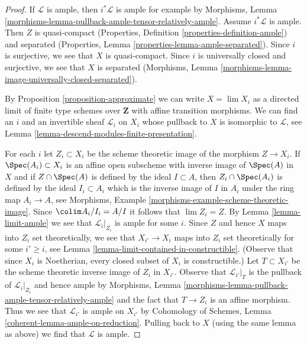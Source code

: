 \begin{proof}
If $\mathcal{L}$ is ample, then $i^*\mathcal{L}$ is ample for
example by Morphisms, Lemma
\ref{morphisms-lemma-pullback-ample-tensor-relatively-ample}.
Assume $i^*\mathcal{L}$ is ample. Then $Z$ is quasi-compact
(Properties, Definition \ref{properties-definition-ample})
and separated
(Properties, Lemma \ref{properties-lemma-ample-separated}).
Since $i$ is surjective, we see that $X$ is quasi-compact.
Since $i$ is universally closed and surjective, we see that
$X$ is separated (Morphisms, Lemma
\ref{morphisms-lemma-image-universally-closed-separated}).

\medskip\noindent
By Proposition \ref{proposition-approximate} we can write
$X = \lim X_i$ as a directed limit of finite type schemes over $\mathbf{Z}$
with affine transition morphisms. We can find an $i$ and an invertible
sheaf $\mathcal{L}_i$ on $X_i$ whose pullback to $X$ is isomorphic to
$\mathcal{L}$, see Lemma \ref{lemma-descend-modules-finite-presentation}.

\medskip\noindent
For each $i$ let $Z_i \subset X_i$ be the scheme theoretic image
of the morphism $Z \to X_i$. If $\Spec(A_i) \subset X_i$ is an affine
open subscheme with inverse image of $\Spec(A)$ in $X$ and if
$Z \cap \Spec(A)$ is defined by the ideal $I \subset A$, then
$Z_i \cap \Spec(A_i)$ is defined by the ideal $I_i \subset A_i$
which is the inverse image of $I$ in $A_i$ under the ring map
$A_i \to A$, see
Morphisms, Example \ref{morphisms-example-scheme-theoretic-image}.
Since $\colim A_i/I_i = A/I$ it follows that $\lim Z_i = Z$.
By Lemma \ref{lemma-limit-ample} we see that $\mathcal{L}_i|_{Z_i}$
is ample for some $i$. Since $Z$ and hence $X$ maps into $Z_i$
set theoretically, we see that $X_{i'} \to X_i$ maps into $Z_i$
set theoretically for some $i' \geq i$, see
Lemma \ref{lemma-limit-contained-in-constructible}.
(Observe that since $X_i$ is Noetherian, every closed subset
of $X_i$ is constructible.) Let $T \subset X_{i'}$
be the scheme theoretic inverse image of $Z_i$ in $X_{i'}$.
Observe that $\mathcal{L}_{i'}|_T$ is the pullback
of $\mathcal{L}_i|_{Z_i}$ and hence ample by
Morphisms, Lemma \ref{morphisms-lemma-pullback-ample-tensor-relatively-ample}
and the fact that $T \to Z_i$ is an affine morphism.
Thus we see that $\mathcal{L}_{i'}$ is ample on $X_{i'}$
by Cohomology of Schemes, Lemma \ref{coherent-lemma-ample-on-reduction}.
Pulling back to $X$ (using the same lemma as above)
we find that $\mathcal{L}$ is ample.
\end{proof}

